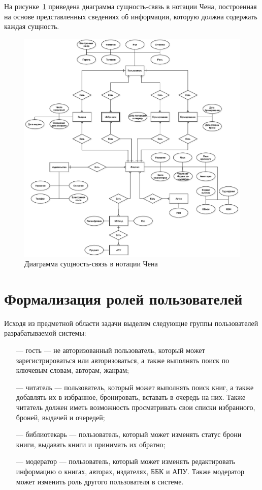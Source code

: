 На рисунке~\ref{fig:chen} приведена диаграмма сущность-связь в нотации Чена, построенная на основе представленных сведениях об информации, которую должна содержать каждая сущность.
\begin{figure}[H]
	\centering
	\includegraphics[scale=0.4]{img/ER.eps}
	\caption{Диаграмма сущность-связь в нотации Чена}
	\label{fig:chen}
\end{figure}

\section{Формализация ролей пользователей}
Исходя из предметной области задачи выделим следующие группы пользователей разрабатываемой системы:
\begin{itemize}
    \item[---] гость --- не авторизованный пользователь, который может зарегистрироваться или авторизоваться, а также выполнять поиск по ключевым словам, авторам, жанрам;
    \item[---] читатель --- пользователь, который может выполнять поиск книг, а также добавлять их в избранное, бронировать, вставать в очередь на них. Также читатель должен иметь возможность просматривать свои списки избранного, броней, выдачей и очередей;
    \item[---] библиотекарь --- пользователь, который может изменять статус брони книги, выдавать книги и принимать их обратно;
    \item[---] модератор --- пользователь, который может изменять редактировать информацию о книгах, авторах, издателях, ББК и АПУ. Также модератор может изменить роль другого пользователя в системе.
\end{itemize}

